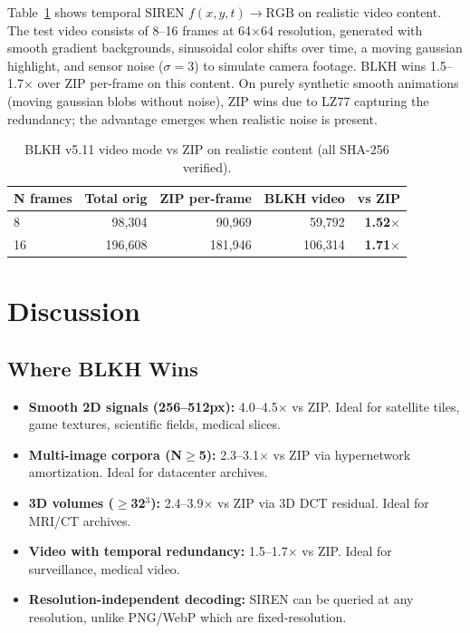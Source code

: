 \documentclass[11pt,a4paper]{article}
\begin{document}
Table~\ref{tab:video} shows temporal SIREN $f(x, y, t) \to \text{RGB}$ on realistic video content. The test video consists of 8--16 frames at 64$\times$64 resolution, generated with smooth gradient backgrounds, sinusoidal color shifts over time, a moving gaussian highlight, and sensor noise ($\sigma{=}3$) to simulate camera footage. BLKH wins 1.5--1.7$\times$ over ZIP per-frame on this content. On purely synthetic smooth animations (moving gaussian blobs without noise), ZIP wins due to LZ77 capturing the redundancy; the advantage emerges when realistic noise is present.

\begin{table}[t]
\centering
\caption{BLKH v5.11 video mode vs ZIP on realistic content (all SHA-256 verified).}
\label{tab:video}
\begin{tabular}{lrrrr}
\toprule
N frames & Total orig & ZIP per-frame & BLKH video & vs ZIP \\
\midrule
8 & 98,304 & 90,969 & 59,792 & \textbf{1.52$\times$} \\
16 & 196,608 & 181,946 & 106,314 & \textbf{1.71$\times$} \\
\bottomrule
\end{tabular}
\end{table}

\section{Discussion}

\subsection{Where BLKH Wins}

\begin{itemize}[leftmargin=*]
    \item \textbf{Smooth 2D signals (256--512px):} 4.0--4.5$\times$ vs ZIP. Ideal for satellite tiles, game textures, scientific fields, medical slices.
    \item \textbf{Multi-image corpora (N$\geq$5):} 2.3--3.1$\times$ vs ZIP via hypernetwork amortization. Ideal for datacenter archives.
    \item \textbf{3D volumes ($\geq$32$^3$):} 2.4--3.9$\times$ vs ZIP via 3D DCT residual. Ideal for MRI/CT archives.
    \item \textbf{Video with temporal redundancy:} 1.5--1.7$\times$ vs ZIP. Ideal for surveillance, medical video.
    \item \textbf{Resolution-independent decoding:} SIREN can be queried at any resolution, unlike PNG/WebP which are fixed-resolution.
\end{itemize}
\end{document}
